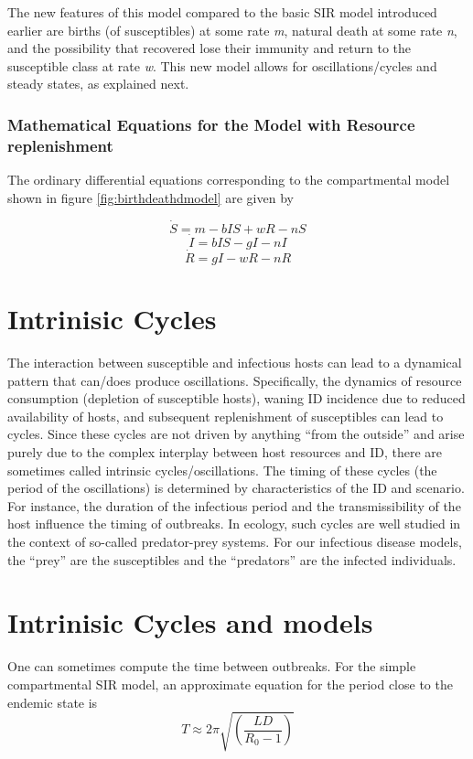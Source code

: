 \documentclass[]{book}
\theoremstyle{definition}
\theoremstyle{definition}
\theoremstyle{definition}
\theoremstyle{remark}
\begin{document}
The new features of this model compared to the basic SIR model
introduced earlier are births (of susceptibles) at some rate \emph{m},
natural death at some rate \emph{n}, and the possibility that recovered
lose their immunity and return to the susceptible class at rate
\emph{w}. This new model allows for oscillations/cycles and steady
states, as explained next.

\subsubsection{Mathematical Equations for the Model with Resource
replenishment}\label{myadvancedbox}

The ordinary differential equations corresponding to the compartmental
model shown in figure \ref{fig:birthdeathdmodel} are given by

\[\dot S = m - b I S + wR - n S \] \[\dot I = b IS - gI - n I \]
\[\dot R =  gI - wR - n R\]

\section{Intrinisic Cycles}\label{intrinisic-cycles}

The interaction between susceptible and infectious hosts can lead to a
dynamical pattern that can/does produce oscillations. Specifically, the
dynamics of resource consumption (depletion of susceptible hosts),
waning ID incidence due to reduced availability of hosts, and subsequent
replenishment of susceptibles can lead to cycles. Since these cycles are
not driven by anything ``from the outside'' and arise purely due to the
complex interplay between host resources and ID, there are sometimes
called intrinsic cycles/oscillations. The timing of these cycles (the
period of the oscillations) is determined by characteristics of the ID
and scenario. For instance, the duration of the infectious period and
the transmissibility of the host influence the timing of outbreaks. In
ecology, such cycles are well studied in the context of so-called
predator-prey systems. For our infectious disease models, the ``prey''
are the susceptibles and the ``predators'' are the infected individuals.

\section{Intrinisic Cycles and
models}\label{intrinisic-cycles-and-models}

One can sometimes compute the time between outbreaks. For the simple
compartmental SIR model, an approximate equation for the period close to
the endemic state is
\[T \approx 2 \pi \sqrt{\left( \frac{LD}{R_0 - 1} \right)}\]
\end{document}
